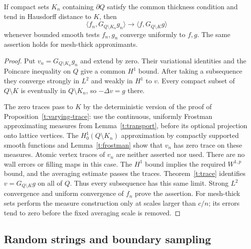 \begin{lemma}\label{t:green-continuity}
If compact sets $K_n$ containing $\partial Q$ satisfy the common thickness
condition and tend in Hausdorff distance to $K$, then
\[
 \langle f_n,G_{Q\setminus K_n}g_n\rangle
 \longrightarrow\langle f,G_{Q\setminus K}g\rangle
\]
whenever bounded smooth tests $f_n,g_n$ converge uniformly to $f,g$.
The same assertion holds for mesh-thick approximants.
\end{lemma}
\begin{proof}
Put $v_n=G_{Q\setminus K_n}g_n$ and extend by zero.  Their variational
identities and the Poincare inequality on $Q$ give a common $H^1$ bound.
After taking a subsequence they converge strongly in $L^2$ and weakly in
$H^1$ to $v$.  Every compact subset of $Q\setminus K$ is eventually in
$Q\setminus K_n$, so $-\Delta v=g$ there.

The zero traces pass to $K$ by the deterministic version of the proof of
Proposition~\ref{t:varying-trace}: use the continuous, uniformly Frostman
approximating measures from Lemma~\ref{t:transport}, before its optional
projection onto lattice vertices.  The $H^1_0(Q\setminus K_n)$
approximation by compactly supported smooth functions and
Lemma~\ref{t:frostman} show that $v_n$ has zero trace on these measures.
Atomic vertex traces of $v_n$ are neither asserted nor used.
There are no wall errors or filling maps in this case.  The $H^1$ bound
implies the required $W^{1,p}$ bound, and the averaging estimate passes
the traces.  Theorem~\ref{t:trace} identifies $v=G_{Q\setminus K}g$ on
all of $Q$.  Thus every subsequence has this same limit.  Strong $L^2$
convergence and uniform convergence of $f_n$ prove the assertion.
For mesh-thick sets perform the measure construction only at scales
larger than $c/n$; its errors tend to zero before the fixed averaging
scale is removed.
\end{proof}

\subsection{Random strings and boundary sampling}

